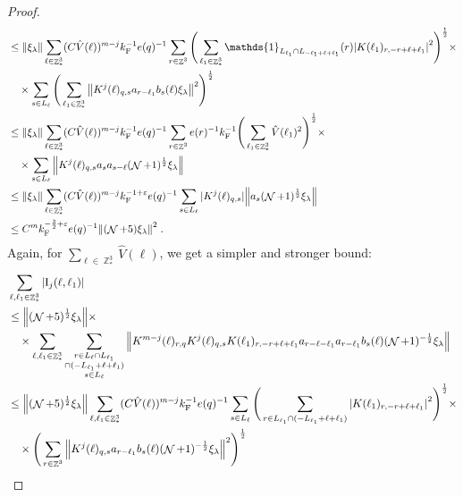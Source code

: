 \documentclass[12pt,a4paper]{article}
\numberwithin{equation}{section}
\newcommand{\1}{\mathbb{I}}
\newcommand{\F}{\mathrm{F}}
\newcommand{\I}{\mathrm{I}}
\DeclareMathOperator{\Z}{\mathbb{Z}}
\DeclareMathOperator{\NN}{\mathcal{N}}
\newcommand{\half}{\frac{1}{2}}
\theoremstyle{plain}
\theoremstyle{definition}
\theoremstyle{remark}
\theoremstyle{plain}
\theoremstyle{definition}
\theoremstyle{remark}
\begin{document}
\begin{proof}
{\begin{align}
	&\leq \norm{ \xi_\lambda} 
		\sum_{\ell \in \Z^3_*}
		(C \hat{V}(\ell))^{m-j} k_{\F}^{-1} e(q)^{-1}
		\sum\limits_{r \in \Z^3} \Bigg(\sum_{\ell_1 \in \Z^3_*} \mathds{1}_{L_{\ell_1} \cap L_{-\ell_1+\ell+\ell_1}}(r) \abs{ K(\ell_1)_{r,-r+\ell+\ell_1} }^2\Bigg)^\half \times\nonumber\\ 
	&\quad \times \sum\limits_{s\in L_{\ell}} \Bigg( \sum_{\ell_1 \in \Z^3_*} \norm{K^{j}(\ell)_{q,s} a_{r-\ell_1} b_{s}(\ell) \xi_\lambda }^2 \Bigg)^\half \nonumber\\
	&\leq \norm{ \xi_\lambda} 
		\sum_{\ell \in \Z^3_*}
		(C \hat{V}(\ell))^{m-j} k_{\F}^{-1} e(q)^{-1}
		\sum\limits_{r \in \Z^3} e(r)^{-1} k_{\F}^{-1} \Bigg(\sum_{\ell_1 \in \Z^3_*} \hat{V}(\ell_1)^2 \Bigg)^\half \times\nonumber\\ 
	&\quad \times \sum\limits_{s\in L_{\ell}} \norm{K^{j}(\ell)_{q,s} a_s a_{s-\ell} (\NN+1)^{\half} \xi_\lambda } \nonumber\\
	&\leq \norm{ \xi_\lambda} 
		\sum_{\ell \in \Z^3_*}
		(C \hat{V}(\ell))^{m-j} k_{\F}^{-1+\varepsilon} e(q)^{-1}
		\sum\limits_{s\in L_{\ell}} |K^{j}(\ell)_{q,s}| \norm{a_s (\NN+1)^{\half} \xi_\lambda } \nonumber\\
	&\leq C^m k_{\F}^{-\frac 32 + \varepsilon} e(q)^{-1} \norm{(\NN+5) \xi_\lambda }^2 \;. \label{eq:estEQ1122_Coulomb}
\end{align}
}
Again, for $ \sum_{\ell \in \Z^3_*} \hat{V}(\ell) $, we get a simpler and stronger bound:
\begin{align}
	&\sum_{\ell,\ell_1 \in \Z^3_*} |\I_j(\ell, \ell_1)| \nonumber\\
	&\leq \norm{ (\NN+5)^{\half} \xi_\lambda} \times \nonumber\\
	&\quad \times \sum_{\ell,\ell_1 \in \Z^3_*} \sum\limits_{\substack{r\in L_{\ell} \cap L_{\ell_1} \\ \cap (-L_{\ell_1} + \ell + \ell_1)\\s\in L_{\ell}}}
		\norm{K^{m-j}(\ell)_{r,q} K^j(\ell)_{q,s} K(\ell_1)_{r,-r+\ell+\ell_1} a_{r-\ell-\ell_1} a_{r-\ell_1} b_{s}(\ell) (\NN+1)^{-\half} \xi_\lambda }\nonumber\\
	&\leq \norm{ (\NN+5)^{\half} \xi_\lambda} 
		\sum_{\ell,\ell_1 \in \Z^3_*} (C \hat{V}(\ell))^{m-j} k_{\F}^{-1} e(q)^{-1}
		\sum\limits_{s\in L_{\ell}} 
		\Bigg(\sum\limits_{r\in L_{\ell_1} \cap (-L_{\ell_1} + \ell + \ell_1)}\abs{ K(\ell_1)_{r,-r+\ell+\ell_1} }^2\Bigg)^\half \times\nonumber\\ 
	&\quad \times\Bigg( \sum\limits_{r \in \Z^3}\norm{K^{j}(\ell)_{q,s} a_{r-\ell_1} b_{s}(\ell) (\NN+1)^{-\half} \xi_\lambda }^2 \Bigg)^\half \nonumber\\

\end{align}
\end{proof}
\end{document}
